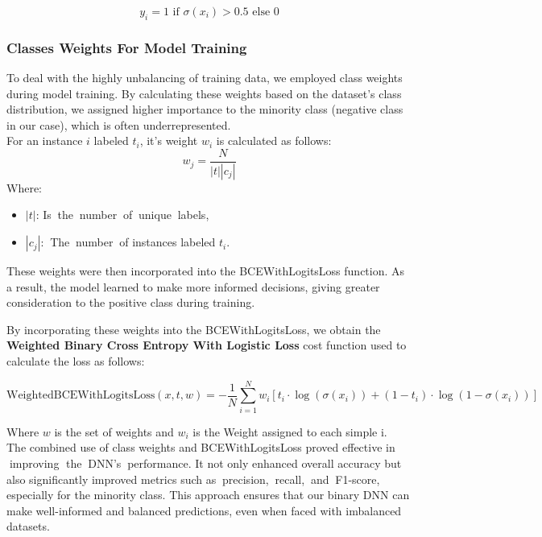 \begin{equation}
y_i = 1 \text{ if } \sigma(x_i) > 0.5 \text{ else } 0 
\end{equation}

\subsubsection{Classes Weights For Model Training}
To deal with the highly unbalancing of training data, we employed class weights \cite{classes_weights1} \cite{classes_weights2} during model training. By calculating these weights based on the dataset's class distribution, we assigned higher importance to the minority class (negative class in our case), which is often underrepresented. \\
For an instance $i$ labeled $t_i$, it's weight $w_i$ is calculated as follows:
\begin{equation}
w_j =  \frac{N}{|t|  |c_j|} 
\end{equation}
Where:
\begin{itemize}
    \item $|t|$: Is\textcolor{white}{..}the\textcolor{white}{..}number\textcolor{white}{..}of\textcolor{white}{..}unique\textcolor{white}{..}labels,
    \item $|c_j|$:\textcolor{white}{..}The\textcolor{white}{..}number\textcolor{white}{..}of instances labeled $t_i$.
\end{itemize}

These weights were then incorporated into the BCEWithLogitsLoss function. As a result, the model learned to make more informed decisions, giving greater consideration to the positive class during training.

By incorporating these weights into the BCEWithLogitsLoss, we obtain the \textbf{Weighted Binary Cross Entropy With Logistic Loss} cost function used to calculate the loss as follows: 

\begin{equation}
\text{WeightedBCEWithLogitsLoss}(x, t, w) = - \frac{1}{N} \sum_{i=1}^{N} w_i \left[ t_i \cdot \log(\sigma(x_i)) + (1 - t_i) \cdot \log(1 - \sigma(x_i)) \right]
\end{equation}

Where $w$ is the set of weights and $w_i$ is the Weight assigned to each simple i.\\
The combined use of class weights and BCEWithLogitsLoss proved effective in \textcolor{white}{.}improving \textcolor{white} {.}the\textcolor{white}{..}DNN's\textcolor{white}{..}performance. It not only enhanced overall accuracy but also significantly improved metrics such as\textcolor{white}{..}precision,\textcolor{white}{..}recall,\textcolor{white}{..}and\textcolor{white}{..}F1-score, especially for the minority class. This approach ensures that our binary DNN can make well-informed and balanced predictions, even when faced with imbalanced datasets.

